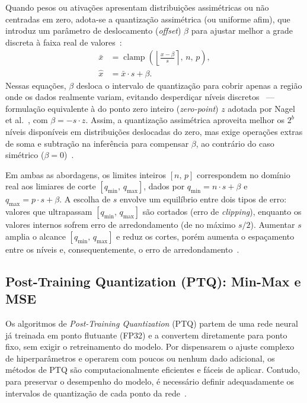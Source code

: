 Quando pesos ou ativações apresentam distribuições assimétricas ou não centradas em zero, adota-se a quantização assimétrica (ou uniforme afim), que introduz um parâmetro de deslocamento (\textit{offset}) $\beta$ para ajustar melhor a grade discreta à faixa real de valores~\cite{bhalgat2020,nagel2021}:
\begin{align}
\bar{x} &= \operatorname{clamp}\!\left(\left\lfloor \frac{x - \beta}{s} \right\rceil,\, n,\, p\right), \label{eq:quant_assim_q} \\
\hat{x} &= \bar{x} \cdot s + \beta. \label{eq:quant_assim_dq}
\end{align}
Nessas equações, $\beta$ desloca o intervalo de quantização para cobrir apenas a região onde os dados realmente variam, evitando desperdiçar níveis discretos~\cite{bhalgat2020} --- formulação equivalente à do ponto zero inteiro (\textit{zero-point}) $z$ adotada por Nagel et al.~\cite{nagel2021}, com $\beta = -s \cdot z$. Assim, a quantização assimétrica aproveita melhor os $2^b$ níveis disponíveis em distribuições deslocadas do zero, mas exige operações extras de soma e subtração na inferência para compensar $\beta$, ao contrário do caso simétrico ($\beta = 0$)~\cite{lin2023,nagel2021}.

Em ambas as abordagens, os limites inteiros $[n,\, p]$ correspondem no domínio real aos limiares de corte $[q_{\min},\, q_{\max}]$, dados por $q_{\min} = n\cdot s + \beta$ e $q_{\max} = p\cdot s + \beta$. A escolha de $s$ envolve um equilíbrio entre dois tipos de erro: valores que ultrapassam $[q_{\min},\, q_{\max}]$ são cortados (erro de \textit{clipping}), enquanto os valores internos sofrem erro de arredondamento (de no máximo $s/2$). Aumentar $s$ amplia o alcance $[q_{\min},\, q_{\max}]$ e reduz os cortes, porém aumenta o espaçamento entre os níveis e, consequentemente, o erro de arredondamento~\cite{nagel2021}.

\subsection{Post-Training Quantization (PTQ): Min-Max e MSE}

Os algoritmos de \textit{Post-Training Quantization} (PTQ) partem de uma rede neural já treinada em ponto flutuante (FP32) e a convertem diretamente para ponto fixo,
sem exigir o retreinamento do modelo. Por dispensarem o ajuste complexo de hiperparâmetros e operarem com poucos ou nenhum dado adicional, os métodos de PTQ são computacionalmente eficientes e fáceis de aplicar. Contudo, para preservar o desempenho do modelo, é necessário definir     
adequadamente os intervalos de quantização de cada ponto da rede~\cite{nagel2021}.

